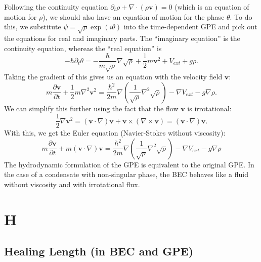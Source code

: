\documentclass{book}
\theoremstyle{definition}
\newcommand{\p}{\partial}
\newcommand{\f}[2]{\frac{#1}{#2}}
\newcommand{\lp}{\left(}
\newcommand{\rp}{\right)}
\begin{document}
Following the continuity equation $\p_t \rho + \nabla \cdot (\rho \mathbf{v}) = 0$ (which is an equation of motion for $\rho$), we should also have an equation of motion for the phase $\theta$. To do this, we substitute $\psi = \sqrt{\rho}\exp(i\theta)$ into the time-dependent GPE and pick out the equations for real and imaginary parts. The ``imaginary equation'' is the continuity equation, whereas the ``real equation'' is 
\begin{equation*}
-\hbar \p_t \theta = -\f{\hbar }{m\sqrt{\rho}} \nabla \sqrt{\rho} + \f{1}{2} m\mathbf{v}^2 + V_{ext} + g\rho.
\end{equation*}
Taking the gradient of this gives us an equation with the velocity field $\mathbf{v}$:
\begin{equation*}
m\f{\p \mathbf{v}}{\p t} + \f{1}{2}m\nabla^2 \mathbf{v}^2 = \f{\hbar^2}{2m} \nabla \lp \f{1}{\sqrt{\rho}} \nabla^2 \sqrt{\rho} \rp - \nabla V_{ext} - g\nabla \rho.
\end{equation*}
We can simplify this further using the fact that the flow $\mathbf{v}$ is irrotational:
\begin{equation*}
\f{1}{2}\nabla \mathbf{v}^2 = (\mathbf{v}\cdot \nabla )\mathbf{v} + \mathbf{v} \times (\nabla \times \mathbf{v}) = (\mathbf{v}\cdot \nabla )\mathbf{v}.
\end{equation*}
With this, we get the Euler equation (Navier-Stokes without viscosity):
\begin{equation*}
\boxed{m\f{\p \mathbf{v}}{\p t} + m (\mathbf{v}\cdot \nabla) \mathbf{v} = \f{\hbar^2}{2m} \nabla \lp \f{1}{\sqrt{\rho}} \nabla^2 \sqrt{\rho} \rp - \nabla V_{ext} - g \nabla \rho} 
\end{equation*}
The hydrodynamic formulation of the GPE is equivalent to the original GPE. In the case of a condensate with non-singular phase, the BEC behaves like a fluid without viscosity and with irrotational flux. 
 

 
\chapter*{H}



\section*{Healing Length (in BEC and GPE)}
\end{document}
